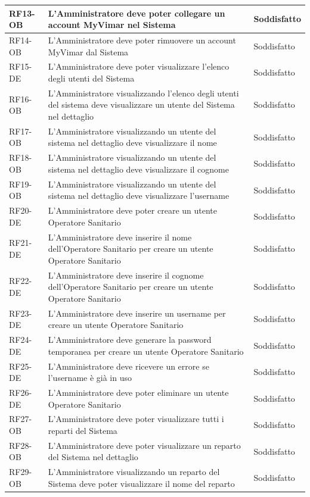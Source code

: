 \begin{longtable}{|p{2.5cm}|p{9cm}|p{3cm}|}
\hline
RF13-OB & L'Amministratore deve poter collegare un account MyVimar nel Sistema & Soddisfatto \\
\hline
RF14-OB & L'Amministratore deve poter rimuovere un account MyVimar dal Sistema & Soddisfatto \\
\hline
RF15-DE & L'Amministratore deve poter visualizzare l'elenco degli utenti del Sistema & Soddisfatto \\
\hline
RF16-OB & L'Amministratore visualizzando l'elenco degli utenti del sistema deve visualizzare un utente del Sistema nel dettaglio & Soddisfatto \\
\hline
RF17-OB & L'Amministratore visualizzando un utente del sistema nel dettaglio deve visualizzare il nome & Soddisfatto \\
\hline
RF18-OB & L'Amministratore visualizzando un utente del sistema nel dettaglio deve visualizzare il cognome & Soddisfatto \\
\hline
RF19-OB & L'Amministratore visualizzando un utente del sistema nel dettaglio deve visualizzare l'username & Soddisfatto \\
\hline
RF20-DE & L'Amministratore deve poter creare un utente Operatore Sanitario & Soddisfatto \\
\hline
RF21-DE & L'Amministratore deve inserire il nome dell'Operatore Sanitario per creare un utente Operatore Sanitario & Soddisfatto \\
\hline
RF22-DE & L'Amministratore deve inserire il cognome dell'Operatore Sanitario per creare un utente Operatore Sanitario & Soddisfatto \\
\hline
RF23-DE & L'Amministratore deve inserire un username per creare un utente Operatore Sanitario & Soddisfatto \\
\hline
RF24-DE & L'Amministratore deve generare la password temporanea per creare un utente Operatore Sanitario & Soddisfatto \\
\hline
RF25-DE & L'Amministratore deve ricevere un errore se l'username è già in uso & Soddisfatto \\
\hline
RF26-DE & L'Amministratore deve poter eliminare un utente Operatore Sanitario & Soddisfatto \\
\hline
RF27-OB & L'Amministratore deve poter visualizzare tutti i reparti del Sistema & Soddisfatto \\
\hline
RF28-OB & L'Amministratore deve poter visualizzare un reparto del Sistema nel dettaglio & Soddisfatto \\
\hline
RF29-OB & L'Amministratore visualizzando un reparto del Sistema deve poter visualizzare il nome del reparto & Soddisfatto \\

\end{longtable}
